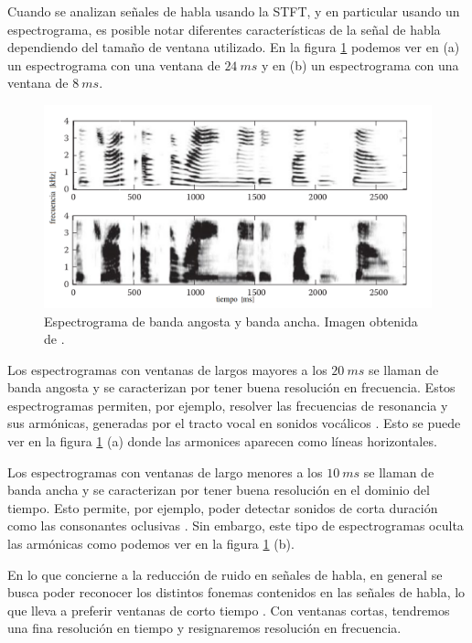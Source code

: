 Cuando se analizan señales de habla usando la STFT, y en particular usando un espectrograma, es posible notar diferentes características de la señal de habla dependiendo del tamaño de ventana utilizado. En la figura \ref{fig:ch2_wideband_narrowband} podemos ver en (a) un espectrograma con una ventana de $\SI{24}{ms}$ y en (b) un espectrograma con una ventana de $\SI{8}{ms}$. 

\begin{figure}[H]
	\centering
	\centerline{\includegraphics[scale=0.4]{images/ch2/wideband_narrowband.png}}
	\caption{Espectrograma de banda angosta y banda ancha. Imagen obtenida de \cite{speech_enhancement_theory_and_practice}.}
	\label{fig:ch2_wideband_narrowband}
\end{figure}

Los espectrogramas con ventanas de largos mayores a los $\SI{20}{ms}$ se llaman de banda angosta y se caracterizan por tener buena resolución en frecuencia. Estos espectrogramas permiten, por ejemplo, resolver las frecuencias de resonancia y sus armónicas, generadas por el tracto vocal en sonidos vocálicos \cite{spoken_language_processing}. Esto se puede ver en la figura \ref{fig:ch2_wideband_narrowband} (a) donde las armonices aparecen como líneas horizontales.

Los espectrogramas con ventanas de largo menores a los $\SI{10}{ms}$ se llaman de banda ancha y se caracterizan por tener buena resolución en el dominio del tiempo. Esto permite, por ejemplo, poder detectar sonidos de corta duración como las consonantes oclusivas \cite{spoken_language_processing}. Sin embargo, este tipo de espectrogramas oculta las armónicas como podemos ver en la figura \ref{fig:ch2_wideband_narrowband} (b).

En lo que concierne a la reducción de ruido en señales de habla, en general se busca poder reconocer los distintos fonemas contenidos en las señales de habla, lo que lleva a preferir ventanas de corto tiempo \cite{speech_enhancement_theory_and_practice}. Con ventanas cortas, tendremos una fina resolución en tiempo y resignaremos resolución en frecuencia.

